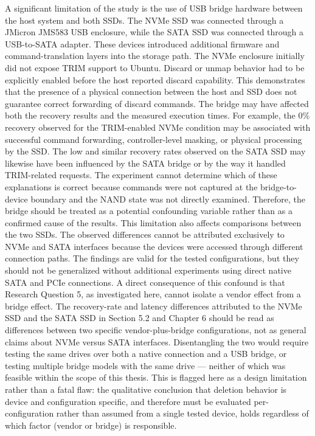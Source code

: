 A significant limitation of the study is the use of USB bridge hardware between the host system and both SSDs. The NVMe SSD was connected through a JMicron JMS583 USB 
enclosure, while the SATA SSD was connected through a USB-to-SATA adapter. These devices introduced additional firmware and command-translation layers into the storage 
path. The NVMe enclosure initially did not expose TRIM support to Ubuntu. Discard or unmap behavior had to be explicitly enabled before the host reported discard 
capability. This demonstrates that the presence of a physical connection between the host and SSD does not guarantee correct forwarding of discard commands. The bridge 
may have affected both the recovery results and the measured execution times. For example, the 0\% recovery observed for the TRIM-enabled NVMe condition may be 
associated with successful command forwarding, controller-level masking, or physical processing by the SSD. The low and similar recovery rates observed on the SATA SSD 
may likewise have been influenced by the SATA bridge or by the way it handled TRIM-related requests. The experiment cannot determine which of these explanations is 
correct because commands were not captured at the bridge-to-device boundary and the NAND state was not directly examined. Therefore, the bridge should be treated as a 
potential confounding variable rather than as a confirmed cause of the results. This limitation also affects comparisons between the two SSDs. The observed differences 
cannot be attributed exclusively to NVMe and SATA interfaces because the devices were accessed through different connection paths. The findings are valid for the tested 
configurations, but they should not be generalized without additional experiments using direct native SATA and PCIe connections. A direct consequence of this confound 
is that Research Question 5, as investigated here, cannot isolate a vendor effect from a bridge effect. The recovery-rate and latency differences attributed to the 
NVMe SSD and the SATA SSD in Section 5.2 and Chapter 6 should be read as differences between two specific vendor-plus-bridge configurations, not as general claims about 
NVMe versus SATA interfaces. Disentangling the two would require testing the same drives over both a native connection and a USB bridge, or testing multiple bridge 
models with the same drive — neither of which was feasible within the scope of this thesis. This is flagged here as a design limitation rather than a fatal flaw: the 
qualitative conclusion that deletion behavior is device and configuration specific, and therefore must be evaluated per-configuration rather than assumed from a single 
tested device, holds regardless of which factor (vendor or bridge) is responsible.

